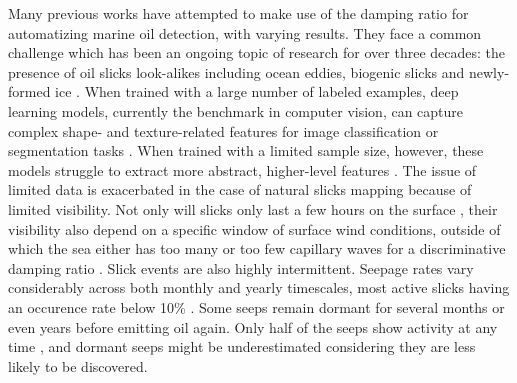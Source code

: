 \documentclass[lettersize,journal]{IEEEtran}
\begin{document}
Many previous works have attempted to make use of the damping ratio for automatizing marine oil detection, with varying results. They face a common challenge which has been an ongoing topic of research for over 
three decades: the presence of oil slicks look-alikes including ocean eddies, biogenic slicks and newly-formed ice \cite{johanssonCanMineralOil2020,hovlandSlickDetectionSAR1994,alpersOilsSurfactants2004,
alpersOilSpillDetection2017}. 
When trained with a large number of labeled examples, deep learning models, currently the benchmark in computer vision, can capture complex shape- and texture-related features for image classification or 
segmentation tasks \cite{goodfellowDeepLearning2016}. When trained with a limited sample size, however, these models struggle to extract more abstract, higher-level features
\cite{bengioDeepLearningRepresentations2012}. The issue of limited data is exacerbated in the case of natural slicks mapping because of limited visibility. 
Not only will slicks only last a few hours on the surface \cite{jatiaultMonitoringNaturalOil2017,daneshgaraslHindcastModelingOil2017,oreillyDistributionMagnitudeVariability2022}, 
their visibility also depend on a specific window of surface wind conditions, outside of which the sea either has too many or too few capillary waves for a discriminative 
damping ratio \cite{quigleyInvestigationDampingRatio2023,sausDetectionDelineationProduced2021,gadeImagingBiogenicAnthropogenic1998}. 
\IEEEpubidadjcol  
Slick events are also highly intermittent. Seepage rates vary considerably across both monthly and yearly timescales, most active slicks having an occurence rate below 10\% 
\cite{jatiaultNaturalOilSeep2024,oreillyDistributionMagnitudeVariability2022}. Some seeps remain dormant for several months or even years before emitting oil again. Only half of the seeps show activity at any time 
\cite{jatiaultMonitoringNaturalOil2017,garcia-pinedaRemotesensingEvaluationGeophysical2010}, and dormant seeps might be underestimated considering they are less likely to be discovered.
\end{document}
